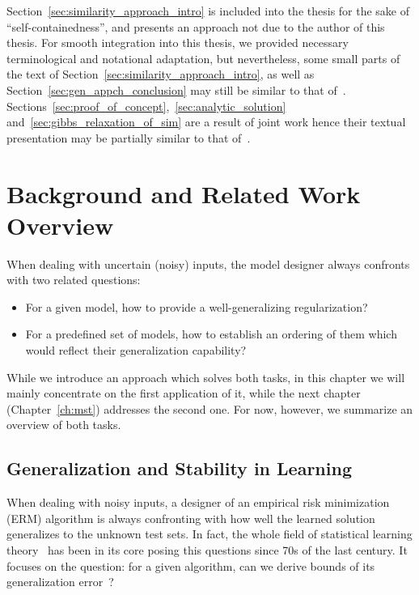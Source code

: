 \myremark Section~\ref{sec:similarity_approach_intro} is included into the
thesis for the sake of ``self-containedness'', and presents an approach not due
to the author of this thesis. For smooth integration into this thesis, we
provided necessary terminological and notational adaptation, but
nevertheless, some small parts of the text of
Section~\ref{sec:similarity_approach_intro}, as well as
Section~\ref{sec:gen_appch_conclusion} may still be similar to that
of~\citet{Sramek:PhD}. Sections~\ref{sec:proof_of_concept},~\ref{sec:analytic_solution}
and~\ref{sec:gibbs_relaxation_of_sim} are a result of joint work hence their
textual presentation may be partially similar to that of~\citet{jcss:2017}.

\section{Background and Related Work Overview}
\label{sec:gen_appch_related_work}

When dealing with uncertain (noisy) inputs, the model designer always confronts
with two related questions:
\begin{itemize}
  \item For a given model, how to provide a well-generalizing regularization?
  \item For a predefined set of models, how to establish an ordering of them which
  would reflect their generalization capability?
\end{itemize}

While we introduce an approach which solves both tasks, in this chapter we will
mainly concentrate on the first application of it, while the next chapter
(Chapter~\ref{ch:mst}) addresses the second one. For now, however, we summarize
an overview of both tasks.

\subsection{Generalization and Stability in Learning}
\label{sec:generalization_stability_in_learning}
When dealing with noisy inputs, a designer of an empirical risk minimization
(ERM) algorithm is always confronting with how well the learned solution
generalizes to the unknown test sets. In fact, the whole field of statistical
learning theory~\citep{Vapnik71,Vapnik:1982}  has been in its core posing this
questions since 70s of the last century. It focuses on the question: for a given
algorithm, can we derive bounds of its generalization error~\citep{Bishop:2006}?

